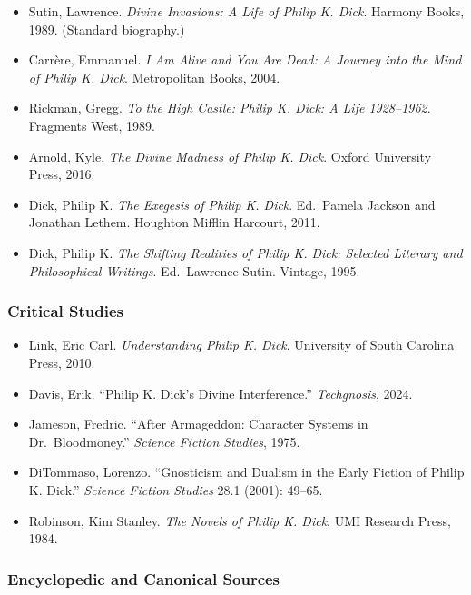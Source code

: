 \documentclass[11pt,letterpaper]{article}
\begin{document}
\begin{itemize}[leftmargin=2em]
\item Sutin, Lawrence. \textit{Divine Invasions: A Life of Philip K. Dick}. Harmony Books, 1989. (Standard biography.)
\item Carrère, Emmanuel. \textit{I Am Alive and You Are Dead: A Journey into the Mind of Philip K. Dick}. Metropolitan Books, 2004.
\item Rickman, Gregg. \textit{To the High Castle: Philip K. Dick: A Life 1928--1962}. Fragments West, 1989.
\item Arnold, Kyle. \textit{The Divine Madness of Philip K. Dick}. Oxford University Press, 2016.
\item Dick, Philip K. \textit{The Exegesis of Philip K. Dick}. Ed.\ Pamela Jackson and Jonathan Lethem. Houghton Mifflin Harcourt, 2011.
\item Dick, Philip K. \textit{The Shifting Realities of Philip K. Dick: Selected Literary and Philosophical Writings}. Ed.\ Lawrence Sutin. Vintage, 1995.
\end{itemize}

\subsubsection{Critical Studies}

\begin{itemize}[leftmargin=2em]
\item Link, Eric Carl. \textit{Understanding Philip K. Dick}. University of South Carolina Press, 2010.
\item Davis, Erik. ``Philip K. Dick's Divine Interference.'' \textit{Techgnosis}, 2024.
\item Jameson, Fredric. ``After Armageddon: Character Systems in Dr.\ Bloodmoney.'' \textit{Science Fiction Studies}, 1975.
\item DiTommaso, Lorenzo. ``Gnosticism and Dualism in the Early Fiction of Philip K. Dick.'' \textit{Science Fiction Studies} 28.1 (2001): 49--65.
\item Robinson, Kim Stanley. \textit{The Novels of Philip K. Dick}. UMI Research Press, 1984.
\end{itemize}

\subsubsection{Encyclopedic and Canonical Sources}
\end{document}
